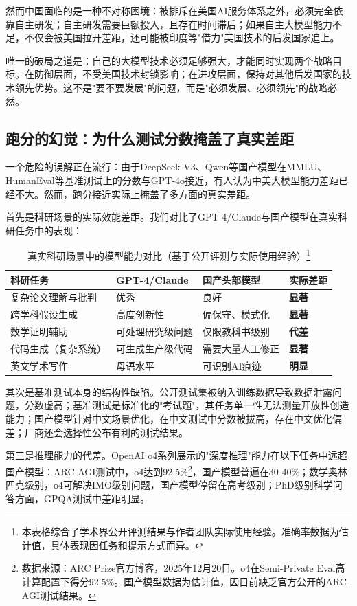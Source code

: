然而中国面临的是一种不对称困境：被排斥在美国AI服务体系之外，必须完全依靠自主研发；自主研发需要巨额投入，且存在时间滞后；如果自主大模型能力不足，不仅会被美国拉开差距，还可能被印度等"借力"美国技术的后发国家追上。

唯一的破局之道是：自己的大模型技术必须足够强大，才能同时实现两个战略目标。在防御层面，不受美国技术封锁影响；在进攻层面，保持对其他后发国家的技术领先优势。这不是"要不要发展"的问题，而是"必须发展、必须领先"的战略必然。

\subsection{跑分的幻觉：为什么测试分数掩盖了真实差距}

一个危险的误解正在流行：由于DeepSeek-V3、Qwen等国产模型在MMLU、HumanEval等基准测试上的分数与GPT-4o接近，有人认为中美大模型能力差距已经不大。然而，跑分接近实际上掩盖了多方面的真实差距。

首先是科研场景的实际效能差距。我们对比了GPT-4/Claude与国产模型在真实科研任务中的表现：

\begin{table}[H]
\centering
\caption{真实科研场景中的模型能力对比（基于公开评测与实际使用经验）\protect\footnote{本表格综合了学术界公开评测结果与作者团队实际使用经验。准确率数据为估计值，具体表现因任务和提示方式而异。}}
\small
\begin{tabular}{p{3.5cm}p{3cm}p{3cm}p{3cm}}
\toprule
\textbf{科研任务} & \textbf{GPT-4/Claude} & \textbf{国产头部模型} & \textbf{实际差距} \\
\midrule
复杂论文理解与批判 & 优秀 & 良好 & \textbf{显著} \\
跨学科假设生成 & 高度创新性 & 偏保守、模式化 & \textbf{显著} \\
数学证明辅助 & 可处理研究级问题 & 仅限教科书级别 & \textbf{代差} \\
代码生成（复杂系统） & 可生成生产级代码 & 需要大量人工修正 & \textbf{显著} \\
英文学术写作 & 母语水平 & 可识别AI痕迹 & \textbf{明显} \\
\bottomrule
\end{tabular}
\end{table}

其次是基准测试本身的结构性缺陷。公开测试集被纳入训练数据导致数据泄露问题，分数虚高；基准测试是标准化的"考试题"，其任务单一性无法测量开放性创造能力；国产模型针对中文场景优化，在中文测试中分数被拔高，存在中文优化偏差；厂商还会选择性公布有利的测试结果。

第三是推理能力的代差。OpenAI o4系列展示的"深度推理"能力在以下任务中远超国产模型：ARC-AGI测试中，o4达到92.5\%\footnote{数据来源：ARC Prize官方博客，2025年12月20日。o4在Semi-Private Eval高计算配置下得分92.5\%。国产模型数据为估计值，因目前缺乏官方公开的ARC-AGI测试结果。}，国产模型普遍在30-40\%；数学奥林匹克级别，o4可解决IMO级别问题，国产模型停留在高考级别；PhD级别科学问答方面，GPQA测试中差距明显。

